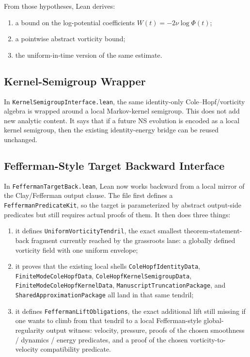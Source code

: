 \documentclass[11pt]{article}
\begin{document}
From those hypotheses, Lean derives:
\begin{enumerate}[leftmargin=1.5em]
  \item a bound on the log-potential coefficients
  \(W(t) = -2\nu \log \Phi(t)\);
  \item a pointwise abstract vorticity bound;
  \item the uniform-in-time version of the same estimate.
\end{enumerate}

\subsection{Kernel-Semigroup Wrapper}

In \texttt{KernelSemigroupInterface.lean}, the same identity-only
Cole--Hopf/vorticity algebra is wrapped around a local Markov-kernel semigroup.
This does not add new analytic content.  It says that if a future NS evolution
is encoded as a local kernel semigroup, then the existing identity-energy
bridge can be reused unchanged.

\subsection{Fefferman-Style Target Backward Interface}

In \texttt{FeffermanTargetBack.lean}, Lean now works backward from a local
mirror of the Clay/Fefferman output clause.  The file first defines a
\texttt{FeffermanPredicateKit}, so the target is parameterized by abstract
output-side predicates but still requires actual proofs of them.  It then does
three things:
\begin{enumerate}[leftmargin=1.5em]
  \item it defines \texttt{UniformVorticityTendril}, the exact smallest
  theorem-statement-back fragment currently reached by the grassroots lane: a
  globally defined vorticity field with one uniform envelope;
  \item it proves that the existing local shells
  \texttt{ColeHopfIdentityData}, \texttt{FiniteModeColeHopfData},
  \texttt{ColeHopfKernelSemigroupData}, \texttt{FiniteModeColeHopfKernelData},
  \texttt{ManuscriptTruncationPackage}, and
  \texttt{SharedApproximationPackage} all land in that same tendril;
  \item it defines \texttt{FeffermanLiftObligations}, the exact additional lift
  still missing if one wants to climb from that tendril to a local
  Fefferman-style global-regularity output witness: velocity, pressure, proofs
  of the chosen smoothness / dynamics / energy predicates, and a proof of the
  chosen vorticity-to-velocity compatibility predicate.
\end{enumerate}
\end{document}
